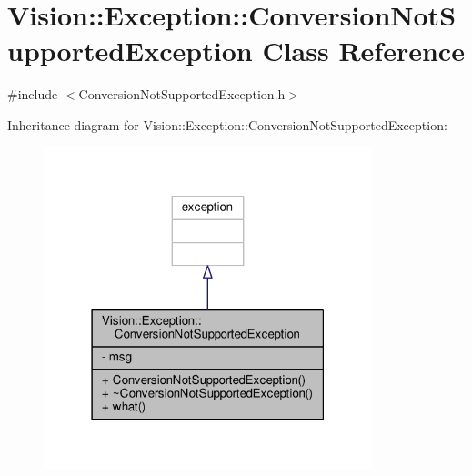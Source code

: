 \hypertarget{class_vision_1_1_exception_1_1_conversion_not_supported_exception}{}\section{Vision\+:\+:Exception\+:\+:Conversion\+Not\+Supported\+Exception Class Reference}
\label{class_vision_1_1_exception_1_1_conversion_not_supported_exception}


{\ttfamily \#include $<$Conversion\+Not\+Supported\+Exception.\+h$>$}



Inheritance diagram for Vision\+:\+:Exception\+:\+:Conversion\+Not\+Supported\+Exception\+:\nopagebreak
\begin{figure}[H]
\begin{center}
\leavevmode
\includegraphics[width=271pt]{class_vision_1_1_exception_1_1_conversion_not_supported_exception__inherit__graph}
\end{center}
\end{figure}


